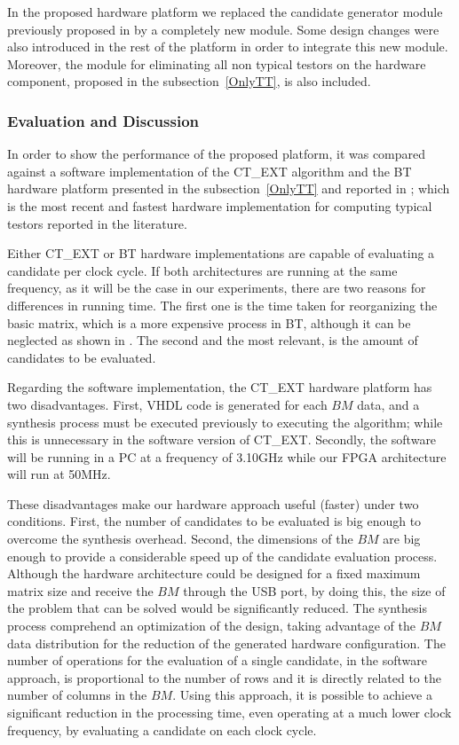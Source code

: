 \documentclass[authoryear,11pt]{elsarticle}
\begin{document}
	In the proposed hardware platform we replaced the candidate generator module previously proposed in
	\citep{Rodriguez14} by a completely new module. Some design changes were also introduced in the rest of 
	the platform in order to integrate this new module. Moreover, the module for eliminating all non typical
	testors on the hardware component, proposed in the subsection~\ref{OnlyTT}, is also included.
	
\subsubsection{Evaluation and Discussion}\label{subsect:CTEXT_eval}
	In order to show the performance of the proposed platform, it was compared against a software 
	implementation of the CT\_EXT algorithm \citep{Sanchez07} and the BT hardware platform presented in the 
	subsection~\ref{OnlyTT} and reported in \citep{Rodriguez14}; which is the most recent and fastest hardware
	implementation for computing typical	testors reported in the literature.
	
	Either CT\_EXT or BT hardware implementations are capable of evaluating a candidate per clock 
	cycle. If both architectures are running at the same frequency, as it will be the case in our experiments, 
	there are two reasons for differences in running time. The first one is the time taken for reorganizing 
	the basic matrix, which is a more expensive process in BT, although it can be neglected as shown in
	\citep{Rojas12}. The second and the most relevant, is the amount of candidates to be evaluated. 
	
	Regarding the software implementation, the CT\_EXT hardware platform has two disadvantages. First, 
	VHDL code is generated for each $BM$ data, and a synthesis process must be executed previously to 
	executing the algorithm; while this is unnecessary in the software version of CT\_EXT. Secondly, the 
	software will be running in a PC at a frequency of 3.10GHz while our FPGA architecture will run at 50MHz. 
	
	These disadvantages make our hardware approach useful (faster) under two conditions. First, the number of 
	candidates to be evaluated is big enough to overcome the synthesis overhead. Second, the dimensions of the 
	$BM$ are big enough to provide a considerable speed up of the candidate evaluation process. Although 
	the hardware architecture could be designed for a fixed maximum matrix size and receive the $BM$ through the 
	USB port, by doing this, the size of the problem that can be solved would be significantly reduced. The 
	synthesis process comprehend an optimization of the design, taking advantage of the $BM$ data distribution for 
	the reduction of the generated hardware configuration. The number of operations for the evaluation of a single 
	candidate, in the software approach, is proportional to the number of rows and it is directly related to the 
	number of columns in the $BM$. Using this approach, it is possible to achieve a significant reduction in the
	processing time, even operating at a much lower clock frequency, by evaluating a candidate on each clock
	cycle.
	
\end{document}
